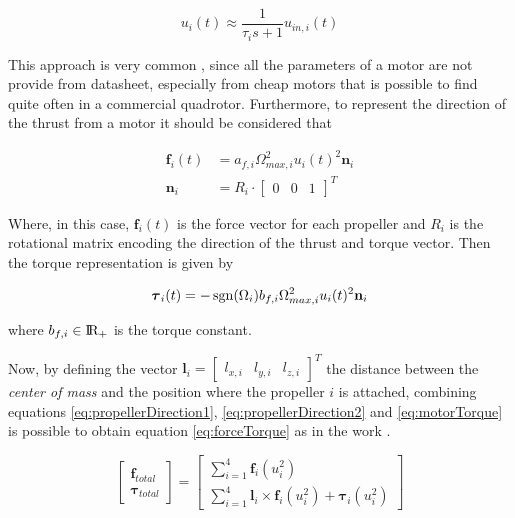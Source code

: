 \begin{equation}
	u_i(t) \approx \frac{1}{\tau_i s+1}u_{in,i}(t)
	\label{eq:motorDelay}
\end{equation}

\noindent This approach is very common \cite{motor}, since all the parameters of a motor are not provide from datasheet, especially from cheap motors that is possible to find quite often in a commercial quadrotor. Furthermore, to represent the direction of the thrust from a motor it should be considered that 

\begin{align}
	\mathbf{f}_i(t) &= a_{f,i} \Omega_{max,i}^2u_i(t)^2\mathbf{n}_i \label{eq:propellerDirection1} \\
	\mathbf{n}_i &= R_i \cdot 
	\begin{bmatrix} 
		0 & 0 & 1 
	\end{bmatrix}^T 
	\label{eq:propellerDirection2}
\end{align} 

\noindent Where, in this case, $\mathbf{f}_i(t)$ is the force vector for each propeller and $R_i$ is the rotational matrix encoding the direction of the thrust and torque vector. Then the torque representation is given by

\begin{equation}
	\boldsymbol{\tau}_i(t) = -\operatorname*{sgn}(\Omega_i)b_{f,i}\Omega_{max,i}^2u_i(t)^2\mathbf{n}_i
	\label{eq:motorTorque}
\end{equation}

\noindent where $b_{f,i} \in \rm I\!R_+$ is the torque constant.

\noindent Now, by defining the vector $\mathbf{l}_i = \begin{bmatrix} l_{x,i} & l_{y,i} & l_{z,i} \end{bmatrix}^T$ the distance between the \textit{center of mass} and the position where the propeller $i$ is attached, combining equations \eqref{eq:propellerDirection1}, \eqref{eq:propellerDirection2} and \eqref{eq:motorTorque} is possible to obtain equation \eqref{eq:forceTorque} as in the work \cite{modelIdentification}.

\begin{equation}
	\begin{bmatrix}
		\mathbf{f}_{total} \\
		\boldsymbol{\tau}_{total}
	\end{bmatrix}
	=
	\begin{bmatrix}
		\sum\limits_{i=1}^{4} \mathbf{f}_i(u_i^2) \\
		\sum\limits_{i=1}^{4} \mathbf{l}_i \times \mathbf{f}_i(u_i^2) + \boldsymbol{\tau}_i(u_i^2)
	\end{bmatrix}
	\label{eq:forceTorque}
\end{equation}

